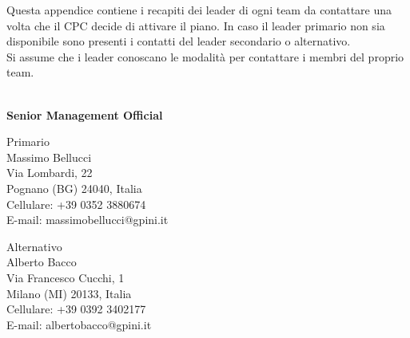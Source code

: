 \documentclass[12pt, a4paper, titlepage]{report}
\begin{document}
	Questa appendice contiene i recapiti dei leader di ogni team da contattare una volta che il CPC decide di attivare il piano. In caso il leader primario non sia disponibile sono presenti i contatti del leader secondario o alternativo.\\
	Si assume che i leader conoscano le modalità per contattare i membri del proprio team.
	\vspace{0.5cm}
	
	\centerline{\textbf{\\Senior Management Official}}
	\begin{paracol}{2}
		\setlength{\columnsep}{5em}
		\begin{leftcolumn}
			\begin{adjustwidth}{0.5cm}{}
				Primario\\
				Massimo Bellucci\\
				Via Lombardi, 22\\ 
				Pognano (BG) 24040, Italia \\
				Cellulare:  +39 0352 3880674 \\
				E-mail: massimobellucci@gpini.it 
			\end{adjustwidth}
		\end{leftcolumn}
		\begin{rightcolumn}
			\begin{adjustwidth}{0.5cm}{}
				Alternativo \\
				Alberto Bacco\\
				Via Francesco Cucchi, 1 \\ 
				Milano (MI) 20133, Italia \\
				Cellulare:  +39 0392 3402177 \\
				E-mail: albertobacco@gpini.it 
			\end{adjustwidth}
		\end{rightcolumn}
	\end{paracol}
	
\end{document}

